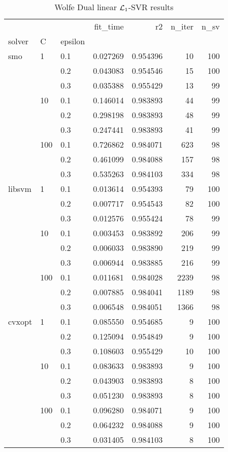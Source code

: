 \begin{table}[H]
\centering
\caption{Wolfe Dual linear $\protect \mathcal{L}_1$-SVR results}
\label{linear_dual_l1_svr_cv_results}
\begin{tabular}{lllrrrr}
\toprule
       &     &     &  fit\_time &        r2 &  n\_iter &  n\_sv \\
solver & C & epsilon &           &           &         &       \\
\midrule
smo & 1   & 0.1 &  0.027269 &  0.954396 &      10 &   100 \\
       &     & 0.2 &  0.043083 &  0.954546 &      15 &   100 \\
       &     & 0.3 &  0.035388 &  0.955429 &      13 &    99 \\
       & 10  & 0.1 &  0.146014 &  0.983893 &      44 &    99 \\
       &     & 0.2 &  0.298198 &  0.983893 &      48 &    99 \\
       &     & 0.3 &  0.247441 &  0.983893 &      41 &    99 \\
       & 100 & 0.1 &  0.726862 &  0.984071 &     623 &    98 \\
       &     & 0.2 &  0.461099 &  0.984088 &     157 &    98 \\
       &     & 0.3 &  0.535263 &  0.984103 &     334 &    98 \\
libsvm & 1   & 0.1 &  0.013614 &  0.954393 &      79 &   100 \\
       &     & 0.2 &  0.007717 &  0.954543 &      82 &   100 \\
       &     & 0.3 &  0.012576 &  0.955424 &      78 &    99 \\
       & 10  & 0.1 &  0.003453 &  0.983892 &     206 &    99 \\
       &     & 0.2 &  0.006033 &  0.983890 &     219 &    99 \\
       &     & 0.3 &  0.006944 &  0.983885 &     216 &    99 \\
       & 100 & 0.1 &  0.011681 &  0.984028 &    2239 &    98 \\
       &     & 0.2 &  0.007885 &  0.984041 &    1189 &    98 \\
       &     & 0.3 &  0.006548 &  0.984051 &    1366 &    98 \\
cvxopt & 1   & 0.1 &  0.085550 &  0.954685 &       9 &   100 \\
       &     & 0.2 &  0.125094 &  0.954849 &       9 &   100 \\
       &     & 0.3 &  0.108603 &  0.955429 &      10 &   100 \\
       & 10  & 0.1 &  0.083633 &  0.983893 &       9 &   100 \\
       &     & 0.2 &  0.043903 &  0.983893 &       8 &   100 \\
       &     & 0.3 &  0.051230 &  0.983893 &       8 &   100 \\
       & 100 & 0.1 &  0.096280 &  0.984071 &       9 &   100 \\
       &     & 0.2 &  0.064232 &  0.984088 &       9 &   100 \\
       &     & 0.3 &  0.031405 &  0.984103 &       8 &   100 \\
\bottomrule
\end{tabular}
\end{table}
